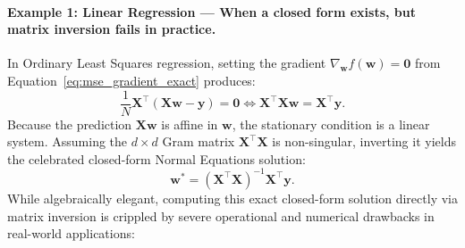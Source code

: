 \paragraph{Example 1: Linear Regression --- When a closed form exists, but matrix inversion fails in practice.}
In Ordinary Least Squares regression, setting the gradient $\nabla_\mathbf{w} f(\mathbf{w}) = \mathbf{0}$ from Equation~\eqref{eq:mse_gradient_exact} produces:
\begin{equation}
\frac{1}{N} \mathbf{X}^\top (\mathbf{X}\mathbf{w} - \mathbf{y}) = \mathbf{0} \iff \mathbf{X}^\top \mathbf{X} \mathbf{w} = \mathbf{X}^\top \mathbf{y}.
\label{eq:normal_equations_ols_repeat}
\end{equation}
Because the prediction $\mathbf{X}\mathbf{w}$ is affine in $\mathbf{w}$, the stationary condition is a linear system. Assuming the $d \times d$ Gram matrix $\mathbf{X}^\top \mathbf{X}$ is non-singular, inverting it yields the celebrated closed-form Normal Equations solution:
\begin{equation}
\mathbf{w}^* = (\mathbf{X}^\top \mathbf{X})^{-1} \mathbf{X}^\top \mathbf{y}.
\label{eq:ols_closed_form_repeat}
\end{equation}
While algebraically elegant, computing this exact closed-form solution directly via matrix inversion is crippled by severe operational and numerical drawbacks in real-world applications:
